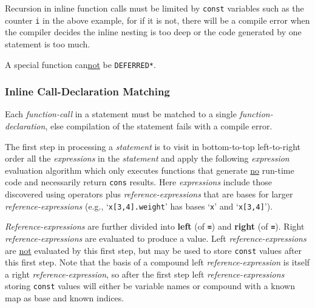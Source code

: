 \documentclass[12pt]{article}
\newcommand{\TT}[1]{{\tt \bfseries #1}}
\newcommand{\key}[1]{{\rm \bfseries #1}}
\begin{document}
Recursion in inline function calls must be limited by {\tt const}
variables such as the counter {\tt i} in the above example,
for if it is not, there
will be a compile error when the compiler decides the inline nesting
is too deep or the code generated by one statement is too much.

A special function can\underline{not} be {\tt *DEFERRED*}.

\subsubsection{Inline Call-Declaration Matching}
\label{INLINE-CALL-DECLARATION-MATCHING}

Each {\em function-call} in a statement must be matched to a single
{\em function-declaration}, else compilation of the statement fails
with a compile error.

The first step in processing
a {\em statement} is to visit in bottom-to-top left-to-right order
all the {\em expressions} in the {\em statement} and apply the following
{\em expression} evaluation algorithm
which only executes functions that generate \underline{no}
run-time code and necessarily return {\tt cons} results.
Here {\em expressions} include those discovered using operators
plus {\em reference-expressions} that are bases for
larger {\em reference-expressions} (e.g., `{\tt x[3,4].weight}' has
bases `{\tt x}' and `{\tt x[3,4]}').

{\em Reference-expressions} are
further divided into \key{left} (of \TT{=}) and \key{right} (of \TT{=}).
Right {\em reference-expressions} are evaluated to produce a value.
Left {\em reference-expressions} are \underline{not} evaluated by this
first step, but may be used to store {\tt const} values after this
first step.  Note that the basis of a compound left
{\em reference-expression} is itself a right {\em reference-expression},
so after the first step left {\em reference-expressions} storing {\tt const}
values will either
be variable names or compound with a known map as base and known indices.

\bigskip
\end{document}
